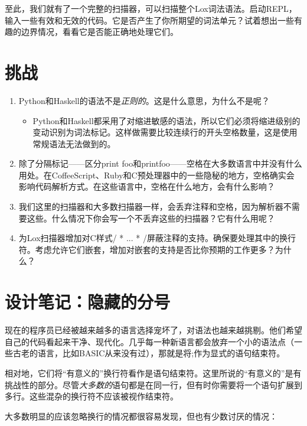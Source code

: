 \documentclass[cn,11pt,chinese]{elegantbook}
\begin{document}
至此，我们就有了一个完整的扫描器，可以扫描整个Lox词法语法。启动REPL，输入一些有效和无效的代码。它是否产生了你所期望的词法单元？试着想出一些有趣的边界情况，看看它是否能正确地处理它们。

\section{挑战}

\begin{enumerate}
  \item Python和Haskell的语法不是\textit{正则的}。这是什么意思，为什么不是呢？
  \begin{itemize}
    \item Python和Haskell都采用了对缩进敏感的语法，所以它们必须将缩进级别的变动识别为词法标记。这样做需要比较连续行的开头空格数量，这是使用常规语法无法做到的。
  \end{itemize}
  \item 除了分隔标记——区分print foo和printfoo——空格在大多数语言中并没有什么用处。在CoffeeScript、Ruby和C预处理器中的一些隐秘的地方，空格确实会影响代码解析方式。在这些语言中，空格在什么地方，会有什么影响？
  \item 我们这里的扫描器和大多数扫描器一样，会丢弃注释和空格，因为解析器不需要这些。什么情况下你会写一个不丢弃这些的扫描器？它有什么用呢？
  \item 为Lox扫描器增加对C样式/ * ... * /屏蔽注释的支持。确保要处理其中的换行符。考虑允许它们嵌套，增加对嵌套的支持是否比你预期的工作更多？为什么？
\end{enumerate}

\section{设计笔记：隐藏的分号}

现在的程序员已经被越来越多的语言选择宠坏了，对语法也越来越挑剔。他们希望自己的代码看起来干净、现代化。几乎每一种新语言都会放弃一个小的语法点（一些古老的语言，比如BASIC从来没有过），那就是将;作为显式的语句结束符。

相对地，它们将“有意义的”换行符看作是语句结束符。这里所说的“有意义的”是有挑战性的部分。尽管\textit{大多数的}语句都是在同一行，但有时你需要将一个语句扩展到多行。这些混杂的换行符不应该被视作结束符。

大多数明显的应该忽略换行的情况都很容易发现，但也有少数讨厌的情况：
\end{document}
